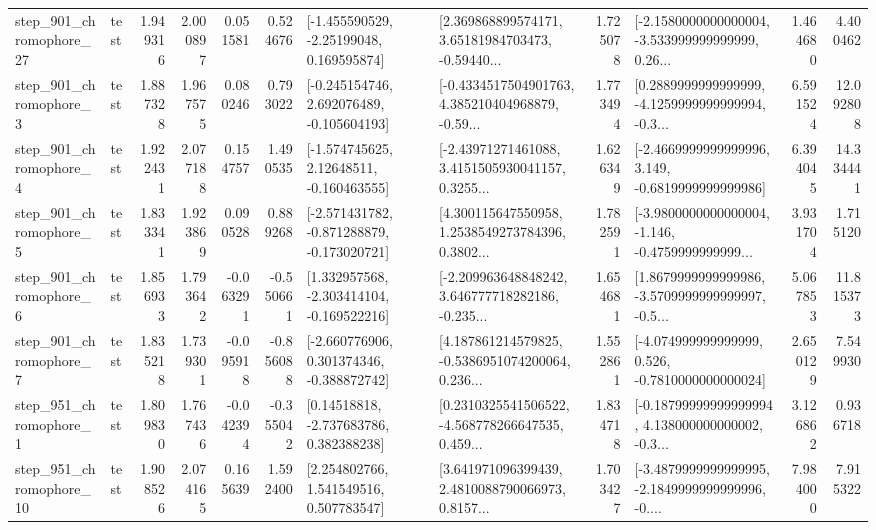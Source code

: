 \begin{tabular}{llrrrrllrlrr}
  step\_901\_chromophore\_27 &      test &      1.949316 &    2.000897 &      0.051581 &  0.524676 &    [-1.455590529, -2.25199048, 0.169595874] &  [2.369868899574171, 3.65181984703473, -0.59440... &       1.725078 &  [-2.1580000000000004, -3.533999999999999, 0.26... &            1.464680 &          4.400462 \\
   step\_901\_chromophore\_3 &      test &      1.887328 &    1.967575 &      0.080246 &  0.793022 &   [-0.245154746, 2.692076489, -0.105604193] &  [-0.4334517504901763, 4.385210404968879, -0.59... &       1.773494 &  [0.2889999999999999, -4.1259999999999994, -0.3... &            6.591524 &         12.092808 \\
   step\_901\_chromophore\_4 &      test &      1.922431 &    2.077188 &      0.154757 &  1.490535 &    [-1.574745625, 2.12648511, -0.160463555] &  [-2.43971271461088, 3.4151505930041157, 0.3255... &       1.626349 &  [-2.4669999999999996, 3.149, -0.6819999999999986] &            6.394045 &         14.334441 \\
   step\_901\_chromophore\_5 &      test &      1.833341 &    1.923869 &      0.090528 &  0.889268 &  [-2.571431782, -0.871288879, -0.173020721] &  [4.300115647550958, 1.2538549273784396, 0.3802... &       1.782591 &  [-3.9800000000000004, -1.146, -0.4759999999999... &            3.931704 &          1.715120 \\
   step\_901\_chromophore\_6 &      test &      1.856933 &    1.793642 &     -0.063291 & -0.550661 &   [1.332957568, -2.303414104, -0.169522216] &  [-2.209963648848242, 3.646777718282186, -0.235... &       1.654681 &  [1.8679999999999986, -3.5709999999999997, -0.5... &            5.067853 &         11.815373 \\
   step\_901\_chromophore\_7 &      test &      1.835218 &    1.739301 &     -0.095918 & -0.856088 &   [-2.660776906, 0.301374346, -0.388872742] &  [4.187861214579825, -0.5386951074200064, 0.236... &       1.552861 &   [-4.074999999999999, 0.526, -0.7810000000000024] &            2.650129 &          7.549930 \\
   step\_951\_chromophore\_1 &      test &      1.809830 &    1.767436 &     -0.042394 & -0.355042 &     [0.14518818, -2.737683786, 0.382388238] &  [0.2310325541506522, -4.568778266647535, 0.459... &       1.834718 &  [-0.18799999999999994, 4.138000000000002, -0.3... &            3.126862 &          0.936718 \\
  step\_951\_chromophore\_10 &      test &      1.908526 &    2.074165 &      0.165639 &  1.592400 &     [2.254802766, 1.541549516, 0.507783547] &  [3.641971096399439, 2.4810088790066973, 0.8157... &       1.703427 &  [-3.4879999999999995, -2.1849999999999996, -0.... &            7.984000 &          7.915322 \\

\end{tabular}
